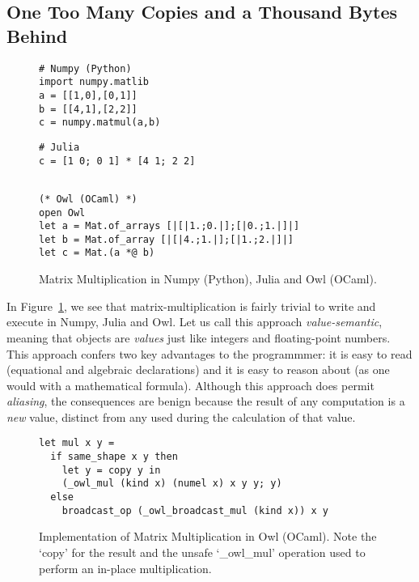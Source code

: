 \subsection{One Too Many Copies and a Thousand Bytes Behind}
\begin{figure}[tbp]
    \centering
    \begin{verbatim}
# Numpy (Python)
import numpy.matlib 
a = [[1,0],[0,1]] 
b = [[4,1],[2,2]] 
c = numpy.matmul(a,b)
    \end{verbatim}
    \begin{verbatim}
# Julia
c = [1 0; 0 1] * [4 1; 2 2]
    \end{verbatim}
    \begin{verbatim}

(* Owl (OCaml) *)
open Owl
let a = Mat.of_arrays [|[|1.;0.|];[|0.;1.|]|]
let b = Mat.of_array [|[|4.;1.|];[|1.;2.|]|]
let c = Mat.(a *@ b)
    \end{verbatim}
    \caption{Matrix Multiplication in Numpy (Python), Julia and Owl (OCaml).}\label{fig:mat_mul_copies}
\end{figure}

In Figure~\ref{fig:mat_mul_copies}, we see that matrix-multiplication is fairly
trivial to write and execute in Numpy, Julia and Owl. Let us call this approach
\emph{value-semantic}, meaning that objects are \emph{values} just like
integers and floating-point numbers. This approach confers two key advantages to the
programmmer: it is easy to read (equational and algebraic declarations) and it
is easy to reason about (as one would with a mathematical formula). Although this
approach does permit \emph{aliasing}, the consequences are benign because the
result of any computation is a \emph{new} value, distinct from any used during
the calculation of that value.

\begin{figure}[tbp]
    \centering
    \begin{verbatim}
let mul x y =
  if same_shape x y then
    let y = copy y in
    (_owl_mul (kind x) (numel x) x y y; y)
  else
    broadcast_op (_owl_broadcast_mul (kind x)) x y
    \end{verbatim}
    \caption{Implementation of Matrix Multiplication in Owl (OCaml).
        Note the `copy' for the result and the unsafe `\_owl\_mul' operation
    used to perform an in-place multiplication.}\label{fig:mat_mul_owl}
\end{figure}

